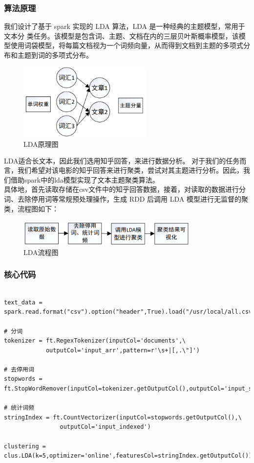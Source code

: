 \documentclass[12pt,a4paper,utf8]{article}
\begin{document}
\subsubsection{算法原理}
我们设计了基于 spark 实现的 LDA 算法，LDA 是一种经典的主题模型，常用于文本分
类任务。该模型是包含词、主题、文档在内的三层贝叶斯概率模型，该模型使用词袋模型，将每篇文档视为一个词频向量，从而得到文档到主题的多项式分布和主题到词的多项式分布。
\begin{figure}[H]
    \centering
    \includegraphics[width=0.6\textwidth]{images/LDA.png}  
    \caption{LDA原理图} 
\end{figure}  
LDA适合长文本，因此我们选用知乎回答，来进行数据分析。
对于我们的任务而言，我们希望对该电影的知乎回答来进行聚类，尝试对其主题进行分析。因此，我们借助spark中的lda模型实现了文本主题聚类算法。\\

具体地，首先读取存储在csv文件中的知乎回答数据，接着，对读取的数据进行分词、去除停用词等常规预处理操作，生成 RDD 后调用 LDA 模型进行无监督的聚类，流程图如下：
\\
\begin{figure}[H]
    \centering
    \includegraphics[width=0.8\textwidth]{images/LDA流程.png}  
    \caption{LDA流程图} 
\end{figure}  

\subsubsection{核心代码}

\small{
\begin{verbatim} 

text_data = spark.read.format("csv").option("header",True).load("/usr/local/all.csv")

# 分词
tokenizer = ft.RegexTokenizer(inputCol='documents',\
            outputCol='input_arr',pattern=r'\s+|[,.\"]')

# 去停用词
stopwords = ft.StopWordRemover(inputCol=tokenizer.getOutputCol(),outputCol='input_stop')

# 统计词频
stringIndex = ft.CountVectorizer(inputCol=stopwords.getOutputCol(),\     
                outputCol='input_indexed')

clustering = clus.LDA(k=5,optimizer='online',featuresCol=stringIndex.getOutputCol())

\end{verbatim}}
\end{document}
